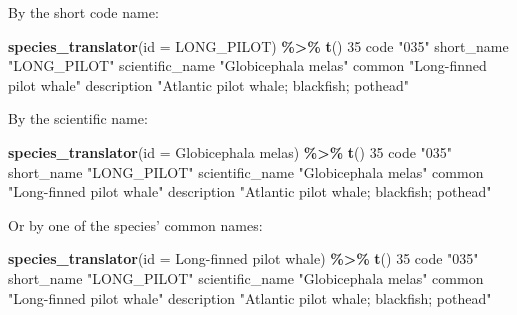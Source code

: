 \documentclass[
]{book}
\newenvironment{Shaded}{\begin{snugshade}}{\end{snugshade}}
\newcommand{\AttributeTok}[1]{\textcolor[rgb]{0.13,0.29,0.53}{#1}}
\newcommand{\DecValTok}[1]{\textcolor[rgb]{0.00,0.00,0.81}{#1}}
\newcommand{\FunctionTok}[1]{\textcolor[rgb]{0.13,0.29,0.53}{\textbf{#1}}}
\newcommand{\NormalTok}[1]{#1}
\newcommand{\SpecialCharTok}[1]{\textcolor[rgb]{0.81,0.36,0.00}{\textbf{#1}}}
\newcommand{\StringTok}[1]{\textcolor[rgb]{0.31,0.60,0.02}{#1}}
\begin{document}
By the short code name:

\begin{Shaded}
\begin{Highlighting}[]
\FunctionTok{species\_translator}\NormalTok{(}\AttributeTok{id =} \StringTok{\textquotesingle{}LONG\_PILOT\textquotesingle{}}\NormalTok{) }\SpecialCharTok{\%\textgreater{}\%} \FunctionTok{t}\NormalTok{()}
                \DecValTok{35}                                        
\NormalTok{code            }\StringTok{"035"}                                     
\NormalTok{short\_name      }\StringTok{"LONG\_PILOT"}                              
\NormalTok{scientific\_name }\StringTok{"Globicephala melas"}                      
\NormalTok{common          }\StringTok{"Long{-}finned pilot whale"}                 
\NormalTok{description     }\StringTok{"Atlantic pilot whale; blackfish; pothead"}
\end{Highlighting}
\end{Shaded}

By the scientific name:

\begin{Shaded}
\begin{Highlighting}[]
\FunctionTok{species\_translator}\NormalTok{(}\AttributeTok{id =} \StringTok{\textquotesingle{}Globicephala melas\textquotesingle{}}\NormalTok{) }\SpecialCharTok{\%\textgreater{}\%} \FunctionTok{t}\NormalTok{()}
                \DecValTok{35}                                        
\NormalTok{code            }\StringTok{"035"}                                     
\NormalTok{short\_name      }\StringTok{"LONG\_PILOT"}                              
\NormalTok{scientific\_name }\StringTok{"Globicephala melas"}                      
\NormalTok{common          }\StringTok{"Long{-}finned pilot whale"}                 
\NormalTok{description     }\StringTok{"Atlantic pilot whale; blackfish; pothead"}
\end{Highlighting}
\end{Shaded}

Or by one of the species' common names:

\begin{Shaded}
\begin{Highlighting}[]
\FunctionTok{species\_translator}\NormalTok{(}\AttributeTok{id =} \StringTok{\textquotesingle{}Long{-}finned pilot whale\textquotesingle{}}\NormalTok{) }\SpecialCharTok{\%\textgreater{}\%} \FunctionTok{t}\NormalTok{()}
                \DecValTok{35}                                        
\NormalTok{code            }\StringTok{"035"}                                     
\NormalTok{short\_name      }\StringTok{"LONG\_PILOT"}                              
\NormalTok{scientific\_name }\StringTok{"Globicephala melas"}                      
\NormalTok{common          }\StringTok{"Long{-}finned pilot whale"}                 
\NormalTok{description     }\StringTok{"Atlantic pilot whale; blackfish; pothead"}
\end{Highlighting}
\end{Shaded}
\end{document}
